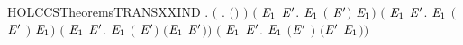 \begin{SaveVerbatim}{HOLCCSTheoremsTRANSXXIND}
\HOLTokenTurnstile{} \HOLSymConst{\HOLTokenForall{}}. \ensuremath{(}\HOLSymConst{\HOLTokenForall{}} .  \ensuremath{(}\HOLSymConst{\ensuremath{\ldotp}}\ensuremath{)}  \ensuremath{)} \HOLSymConst{\HOLTokenConj{}}
       \ensuremath{(}\HOLSymConst{\HOLTokenForall{}}  \ensuremath{\HOLBoundVar{E}\sb{\mathrm{1}}} \ensuremath{\HOLBoundVar{E}\sp{\prime{}}}.    \ensuremath{\HOLBoundVar{E}\sb{\mathrm{1}}} \HOLSymConst{\HOLTokenImp{}}  \ensuremath{(} \HOLSymConst{\ensuremath{+}} \ensuremath{\HOLBoundVar{E}\sp{\prime{}}}\ensuremath{)}  \ensuremath{\HOLBoundVar{E}\sb{\mathrm{1}}}\ensuremath{)} \HOLSymConst{\HOLTokenConj{}}
       \ensuremath{(}\HOLSymConst{\HOLTokenForall{}}  \ensuremath{\HOLBoundVar{E}\sb{\mathrm{1}}} \ensuremath{\HOLBoundVar{E}\sp{\prime{}}}.    \ensuremath{\HOLBoundVar{E}\sb{\mathrm{1}}} \HOLSymConst{\HOLTokenImp{}}  \ensuremath{(}\ensuremath{\HOLBoundVar{E}\sp{\prime{}}} \HOLSymConst{\ensuremath{+}} \ensuremath{)}  \ensuremath{\HOLBoundVar{E}\sb{\mathrm{1}}}\ensuremath{)} \HOLSymConst{\HOLTokenConj{}}
       \ensuremath{(}\HOLSymConst{\HOLTokenForall{}}  \ensuremath{\HOLBoundVar{E}\sb{\mathrm{1}}} \ensuremath{\HOLBoundVar{E}\sp{\prime{}}}.    \ensuremath{\HOLBoundVar{E}\sb{\mathrm{1}}} \HOLSymConst{\HOLTokenImp{}}  \ensuremath{(} \HOLSymConst{\ensuremath{\mid}} \ensuremath{\HOLBoundVar{E}\sp{\prime{}}}\ensuremath{)}  \ensuremath{(}\ensuremath{\HOLBoundVar{E}\sb{\mathrm{1}}} \HOLSymConst{\ensuremath{\mid}} \ensuremath{\HOLBoundVar{E}\sp{\prime{}}}\ensuremath{)}\ensuremath{)} \HOLSymConst{\HOLTokenConj{}}
       \ensuremath{(}\HOLSymConst{\HOLTokenForall{}}  \ensuremath{\HOLBoundVar{E}\sb{\mathrm{1}}} \ensuremath{\HOLBoundVar{E}\sp{\prime{}}}.    \ensuremath{\HOLBoundVar{E}\sb{\mathrm{1}}} \HOLSymConst{\HOLTokenImp{}}  \ensuremath{(}\ensuremath{\HOLBoundVar{E}\sp{\prime{}}} \HOLSymConst{\ensuremath{\mid}} \ensuremath{)}  \ensuremath{(}\ensuremath{\HOLBoundVar{E}\sp{\prime{}}} \HOLSymConst{\ensuremath{\mid}} \ensuremath{\HOLBoundVar{E}\sb{\mathrm{1}}}\ensuremath{)}\ensuremath{)} \HOLSymConst{\HOLTokenConj{}}

\end{SaveVerbatim}
